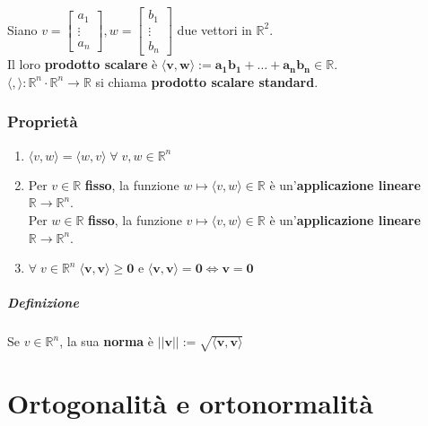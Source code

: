 \documentclass[a4paper, 12pt]{report}
\begin{document}
        \paragraph{}Siano $
        v=
        \begin{bmatrix}
            a_1\\
            \vdots\\
            a_n
        \end{bmatrix},
        w=
        \begin{bmatrix}
            b_1\\
            \vdots\\
            b_n
        \end{bmatrix}
        $ due vettori in $\mathbb{R}^2$.\\
        Il loro \textbf{prodotto scalare} è $\boldsymbol{\langle v,w\rangle:=a_1b_1+\dots+a_nb_n \in \mathbb{R}}$.\\
        $\langle , \rangle: \mathbb{R}^n \cdot \mathbb{R}^n \rightarrow \mathbb{R}$ si chiama \textbf{prodotto scalare standard}.
        \subsection{Proprietà}
        \begin{enumerate}
            \item $\langle v,w\rangle=\langle w,v\rangle \; \forall \; v,w \in \mathbb{R}^n$
            \item Per $v \in \mathbb{R}$ \textbf{fisso}, la funzione $w\mapsto \langle v,w\rangle \in \mathbb{R}$ è un'\textbf{applicazione lineare} $\mathbb{R} \rightarrow \mathbb{R}^n$.\\
            Per $w \in \mathbb{R}$ \textbf{fisso}, la funzione $v\mapsto \langle v,w\rangle \in \mathbb{R}$ è un'\textbf{applicazione lineare} $\mathbb{R} \rightarrow \mathbb{R}^n$.
            \item $\forall \; v \in \mathbb{R}^n \; \boldsymbol{\langle v,v \rangle \geq 0}$ e $\boldsymbol{\langle v,v \rangle =0 \Leftrightarrow v=0}$
        \end{enumerate}
        \paragraph{Definizione} Se $v \in \mathbb{R}^n$, la sua \textbf{norma} è $\boldsymbol{||v||:=\sqrt{\langle v,v\rangle}}$
    \chapter{Ortogonalità e ortonormalità}
\end{document}
